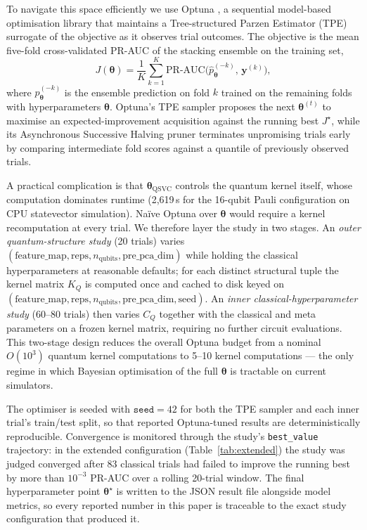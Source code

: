 \documentclass[twocolumn,10pt]{article}
\begin{document}
To navigate this space efficiently we use Optuna \cite{optuna2019}, a sequential model-based optimisation library that maintains a Tree-structured Parzen Estimator (TPE) surrogate of the objective as it observes trial outcomes. The objective is the mean five-fold cross-validated PR-AUC of the stacking ensemble on the training set,
\begin{equation}
J(\boldsymbol{\theta}) = \frac{1}{K}\sum_{k=1}^{K}\mathrm{PR\text{-}AUC}\bigl(\hat{p}^{(-k)}_{\boldsymbol{\theta}},\, \mathbf{y}^{(k)}\bigr),
\label{eq:optuna_obj}
\end{equation}
where $\hat{p}^{(-k)}_{\boldsymbol{\theta}}$ is the ensemble prediction on fold $k$ trained on the remaining folds with hyperparameters $\boldsymbol{\theta}$. Optuna's TPE sampler proposes the next $\boldsymbol{\theta}^{(t)}$ to maximise an expected-improvement acquisition against the running best $J^{\star}$, while its Asynchronous Successive Halving pruner terminates unpromising trials early by comparing intermediate fold scores against a quantile of previously observed trials.

A practical complication is that $\boldsymbol{\theta}_{\mathrm{QSVC}}$ controls the quantum kernel itself, whose computation dominates runtime (2{,}619\,s for the 16-qubit Pauli configuration on CPU statevector simulation). Na\"{i}ve Optuna over $\boldsymbol{\theta}$ would require a kernel recomputation at every trial. We therefore layer the study in two stages. An \emph{outer quantum-structure study} (20 trials) varies $(\text{feature\_map}, \text{reps}, n_{\text{qubits}}, \text{pre\_pca\_dim})$ while holding the classical hyperparameters at reasonable defaults; for each distinct structural tuple the kernel matrix $K_{Q}$ is computed once and cached to disk keyed on $(\text{feature\_map}, \text{reps}, n_{\text{qubits}}, \text{pre\_pca\_dim}, \mathrm{seed})$. An \emph{inner classical-hyperparameter study} (60--80 trials) then varies $C_{Q}$ together with the classical and meta parameters on a frozen kernel matrix, requiring no further circuit evaluations. This two-stage design reduces the overall Optuna budget from a nominal $O(10^{3})$ quantum kernel computations to 5--10 kernel computations --- the only regime in which Bayesian optimisation of the full $\boldsymbol{\theta}$ is tractable on current simulators.

The optimiser is seeded with $\mathtt{seed}=42$ for both the TPE sampler and each inner trial's train/test split, so that reported Optuna-tuned results are deterministically reproducible. Convergence is monitored through the study's \texttt{best\_value} trajectory: in the extended configuration (Table~\ref{tab:extended}) the study was judged converged after 83 classical trials had failed to improve the running best by more than $10^{-3}$ PR-AUC over a rolling 20-trial window. The final hyperparameter point $\boldsymbol{\theta}^{\star}$ is written to the JSON result file alongside model metrics, so every reported number in this paper is traceable to the exact study configuration that produced it.
\end{document}
